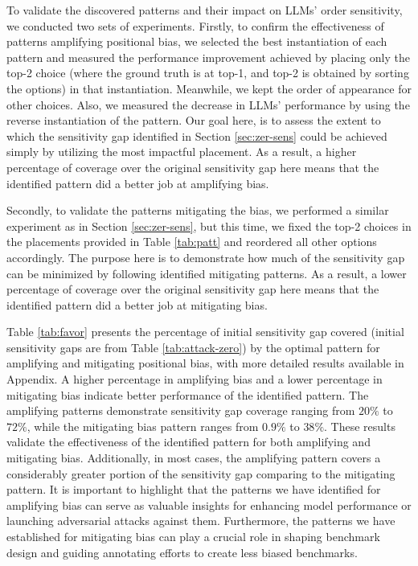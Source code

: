 \documentclass[11pt]{article}
\begin{document}
To validate the discovered patterns and their impact on LLMs' order sensitivity, we conducted two sets of experiments. 
Firstly, to confirm the effectiveness of patterns amplifying positional bias, we selected the best instantiation of each pattern and measured the performance improvement achieved by placing only the top-2 choice (where the ground truth is at top-1, and top-2 is obtained by sorting the options) in that instantiation. Meanwhile, we kept the order of appearance for other choices. 
Also, we measured the decrease in LLMs' performance by using the reverse instantiation of the pattern. 
Our goal here, is to assess the extent to which the sensitivity gap identified in Section \ref{sec:zer-sens} could be achieved simply by utilizing the most impactful placement. As a result, a higher percentage of coverage over the original sensitivity gap here means that the identified pattern did a better job at amplifying bias.

Secondly, to validate the patterns mitigating the bias, we performed a similar experiment as in Section \ref{sec:zer-sens}, but this time, we fixed the top-2 choices in the placements provided in Table \ref{tab:patt} and reordered all other options accordingly. 
The purpose here is to demonstrate how much of the sensitivity gap can be minimized by following identified mitigating patterns. As a result, a lower percentage of coverage over the original sensitivity gap here means that the identified pattern did a better job at mitigating bias.

Table \ref{tab:favor} presents the percentage of initial sensitivity gap covered (initial sensitivity gaps are from Table \ref{tab:attack-zero}) by the optimal pattern for amplifying and mitigating positional bias, with more detailed results available in Appendix. 
A higher percentage in amplifying bias and a lower percentage in mitigating bias indicate better performance of the identified pattern. 
The amplifying patterns demonstrate sensitivity gap coverage ranging from $20\%$ to $72\%$, while the mitigating bias pattern ranges from $0.9\%$ to $38\%$. 
These results validate the effectiveness of the identified pattern for both amplifying and mitigating bias. 
Additionally, in most cases, the amplifying pattern covers a considerably greater portion of the sensitivity gap comparing to the mitigating pattern. 
It is important to highlight that the patterns we have identified for amplifying bias can serve as valuable insights for enhancing model performance or launching adversarial attacks against them. Furthermore, the patterns we have established for mitigating bias can play a crucial role in shaping benchmark design and guiding annotating efforts to create less biased benchmarks.
\end{document}
